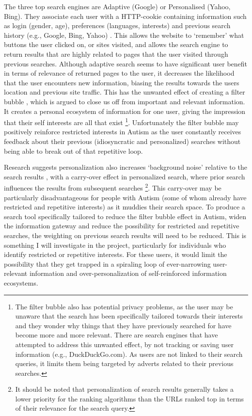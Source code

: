 \documentclass[a4paper, 10pt]{article}
\begin{document}
The three top search engines are Adaptive (Google) or Personalised (Yahoo, Bing). They associate each user with a HTTP-cookie containing information such as login (gender, age), preferences (languages, interests) and previous search history (e.g., Google, Bing, Yahoo) \cite{googlepersonalised, yahooadaptive, bingadaptive}. This allows the website to ‘remember’ what buttons the user clicked on, or sites visited, and allows the search engine to return results that are highly related to pages that the user visited through previous searches. Although adaptive search seems to have significant user benefit in terms of relevance of returned pages to the user, it decreases the likelihood that the user encounters new information, biasing the results towards the users location and previous site traffic.  This has the unwanted effect of creating a filter bubble \cite{Pariser}, which is argued to close us off from important and relevant information. It creates a personal ecosystem of information for one user, giving the impression that their self interests are all that exist \footnote{The filter bubble also has potential privacy problems, as the user may be unaware that the search has been specifically tailored towards their interests and they wonder why things that they have previously searched for have become more and more relevant. There are search engines that have attempted to address this unwanted effect, by not tracking or saving user information (e.g., DuckDuckGo.com). As users are not linked to their search queries, it limits them being targeted by adverts related to their previous searches.}. Unfortunately the filter bubble may positively reinforce restricted interests in Autism as the user constantly receives feedback about their previous (idiosyncratic and personalized) searches without being able to break out of that repetitive loop. 

Research suggests personalization also increases ‘background noise’ relative to the search results \cite{briggs}, with a carry-over effect in personalized search, where prior search influences the results from subsequent searches \footnote{It should be noted that personalization of search results generally takes a lower priority for the ranking algorithms than the URLs ranked top in terms of their relevance for the search query.}. This carry-over may be particularly disadvantageous for people with Autism (some of whom already have restricted and repetitive interests) as it muddies their search space. To produce a search tool specifically tailored to reduce the filter bubble effect in Autism, widen the information gateway and reduce the possibility for restricted and repetitive searches, the weighting on previous search results will need to be reduced. This is something I will investigate in the project, particularly for individuals who identify restricted or repetitive interests. For these users, it would limit the possibility that they get trapped in a spiraling loop of ever-narrowing user-relevant information and over-personalization of self-reinforced information ecosystems.
\end{document}
